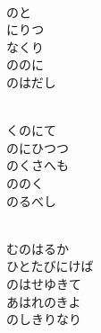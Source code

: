 \documentclass[10pt,b5j]{tarticle} %
\begin{document}
\vspace{1.5em} %
\newcommand{\linespace}{0.5em} %
\newcommand{\blocksize}{0.5\hsize} %
\newcommand{\itemmargin}{3em} %
\begin{enumerate} %
    \setlength{\itemindent}{\itemmargin} %
    \begin{minipage}[c]{\blocksize}
    
        \vspace{\linespace}
        \item~\\
        のと\\
        にりつ\\
        なくり\\
        ののに\\
        のはだし
        
    \end{minipage}
    \begin{minipage}[c]{\blocksize}
        
        \vspace{\linespace}
        \item~\\
        くのにて\\
        のにひつつ\\
        のくさへも\\
        ののく\\
        のるべし
        
    \end{minipage}
    \begin{minipage}[c]{\blocksize}
        
        \vspace{\linespace}
        \item~\\
        むのはるか\\
        ひとたびにけば\\
        のはせゆきて\\
        あはれのきよ\\
        のしきりなり
        

\end{minipage}
\end{enumerate}
\end{document}
